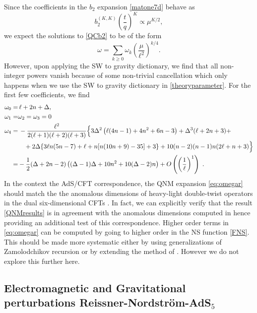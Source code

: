 \documentclass[11pt]{article}
\numberwithin{equation}{section}
\begin{document}
Since the coefficients in the $b_2$ expansion \eqref{matone7d} behave as
\begin{equation}
b_2^{(K,K)}\left(\frac{t}{q}\right)^{K}\propto \mu^{K/2},
\end{equation}
we expect the  solutions to \eqref{QCb2} to be of the form
\begin{equation}\label{eq:omegar}
\omega = \sum_{k \geq 0} \omega_k \left( \frac{\mu}{\ell^2} \right)^{k/4}.
\end{equation}
However, upon applying the SW to gravity dictionary, we find that  all non-integer powers vanish because of some non-trivial cancellation which only happens when we use the SW to gravity dictionary in \eqref{theoryparameter}. For the first few coefficients, we find
\begin{equation}\label{QNMresults}
\begin{aligned}
\omega_0=&\,\ell+2n+\Delta,\\
\omega_{1}=&\omega_{2}=\omega_3=0\\
\omega_4=&\,-\frac{\ell^2}{2 (\ell+1) (\ell+2) (\ell+3)}\Bigl\{3 \Delta ^2 \left(\ell (4 n-1)+4 n^2+6 n-3\right)+\Delta ^3 (\ell+2 n+3)+\\
&\quad+2 \Delta  \{3 \ell n (5 n-7)+\ell+n [n (10 n+9)-35]+3\}+10 (n-2) (n-1) n (2 \ell+n+3)\Bigr\}\\
=&-\frac{1}{2} (\Delta +2 n-2) \left((\Delta -1) \Delta +10 n^2+10 (\Delta -2) n\right)+O\left(\left(\frac{1}{\ell}\right)^1\right)~.
\end{aligned}
\end{equation}
In the context  the AdS/CFT correspondence, the QNM expansion \eqref{eq:omegar} should match the the anomalous dimensions of heavy-light double-twist operators in the dual six-dimensional CFTs \cite{Kulaxizi:2018dxo,Karlsson:2019qfi,Karlsson:2019dbd,Karlsson:2021duj,Dodelson:2022eiz}. In fact, we can explicitly verify that the result \eqref{QNMresults} is in agreement with the anomalous dimensions computed in \cite{Li:2020dqm} hence providing an additional test of this correspondence.
Higher order terms in \eqref{eq:omegar} can be computed by going to higher order in the NS function \eqref{FNS}. This should be made more systematic either by using  generalizations of Zamolodchikov  recursion \cite{zamorecursion,Cho:2017oxl} or by extending the method of \cite[App.A]{Lisovyy:2022flm}. However we do not explore this further here.



\subsection{Electromagnetic and Gravitational perturbations Reissner-Nordstr\"om-AdS\texorpdfstring{$_5$}{} }\label{sec:AdS5}
 
\end{document}
